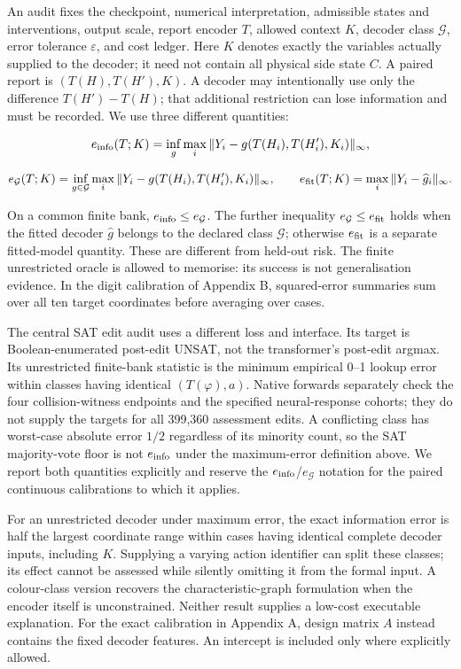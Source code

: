 \documentclass[
  british,
  11pt,
  a4paper,
]{article}
\begin{document}
An audit fixes the checkpoint, numerical interpretation, admissible
states and interventions, output scale, report encoder \(T\), allowed
context \(K\), decoder class \(\mathcal G\), error tolerance
\(\varepsilon\), and cost ledger. Here \(K\) denotes exactly the
variables actually supplied to the decoder; it need not contain all
physical side state \(C\). A paired report is \((T(H),T(H'),K)\). A
decoder may intentionally use only the difference \(T(H')-T(H)\); that
additional restriction can lose information and must be recorded. We use
three different quantities:

\[
e_{\rm info}(T;K)=\inf_g\max_i\|Y_i-g(T(H_i),T(H_i'),K_i)\|_\infty,
\]

\[
e_{\mathcal G}(T;K)=\inf_{g\in\mathcal G}\max_i\|Y_i-g(T(H_i),T(H_i'),K_i)\|_\infty,
\qquad e_{\rm fit}(T;K)=\max_i\|Y_i-\widehat g_i\|_\infty.
\]

On a common finite bank, \(e_{\rm info}\le e_{\mathcal G}\). The further
inequality \(e_{\mathcal G}\le e_{\rm fit}\) holds when the fitted
decoder \(\widehat g\) belongs to the declared class \(\mathcal G\);
otherwise \(e_{\rm fit}\) is a separate fitted-model quantity. These are
different from held-out risk. The finite unrestricted oracle is allowed
to memorise: its success is not generalisation evidence. In the digit
calibration of Appendix B, squared-error summaries sum over all ten
target coordinates before averaging over cases.

The central SAT edit audit uses a different loss and interface. Its
target is Boolean-enumerated post-edit UNSAT, not the transformer's
post-edit argmax. Its unrestricted finite-bank statistic is the minimum
empirical 0--1 lookup error within classes having identical
\((T(\varphi),a)\). Native forwards separately check the four
collision-witness endpoints and the specified neural-response cohorts;
they do not supply the targets for all 399,360 assessment edits. A
conflicting class has worst-case absolute error \(1/2\) regardless of
its minority count, so the SAT majority-vote floor is not
\(e_{\rm info}\) under the maximum-error definition above. We report
both quantities explicitly and reserve the
\(e_{\rm info}\)/\(e_{\mathcal G}\) notation for the paired continuous
calibrations to which it applies.

For an unrestricted decoder under maximum error, the exact information
error is half the largest coordinate range within cases having identical
complete decoder inputs, including \(K\). Supplying a varying action
identifier can split these classes; its effect cannot be assessed while
silently omitting it from the formal input. A colour-class version
recovers the characteristic-graph formulation when the encoder itself is
unconstrained. Neither result supplies a low-cost executable
explanation. For the exact calibration in Appendix A, design matrix
\(A\) instead contains the fixed decoder features. An intercept is
included only where explicitly allowed.
\end{document}
